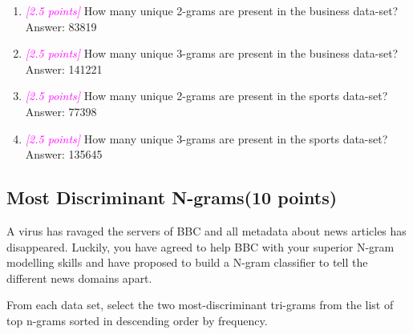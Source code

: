 \documentclass{exam}
\newcommand{\grade}[1]{\small\textcolor{magenta}{\emph{[#1 points]}} \normalsize}
\begin{document}
\begin{enumerate}
\item \grade{2.5} How many unique 2-grams are present in the business data-set?
\\Answer: 83819


\vspace{1cm}
\item \grade{2.5} How many unique 3-grams are present in the business data-set?
\\Answer: 141221



\vspace{1cm}
\item \grade{2.5} How many unique 2-grams are present in the sports data-set?
\\Answer: 77398


\vspace{1cm}
\item \grade{2.5} How many unique 3-grams are present in the sports
data-set?
\\Answer: 135645


\vspace{1cm}
\end{enumerate}

\newpage
\subsection{Most Discriminant N-grams(10 points)}
A virus has ravaged the servers of BBC and all metadata about news articles has disappeared. Luckily, you have agreed to help BBC with your superior N-gram modelling skills and have proposed to build a N-gram classifier to tell the different news domains apart.

From each data set, select the two most-discriminant tri-grams from the list of top n-grams sorted in descending order by frequency. 
\end{document}
